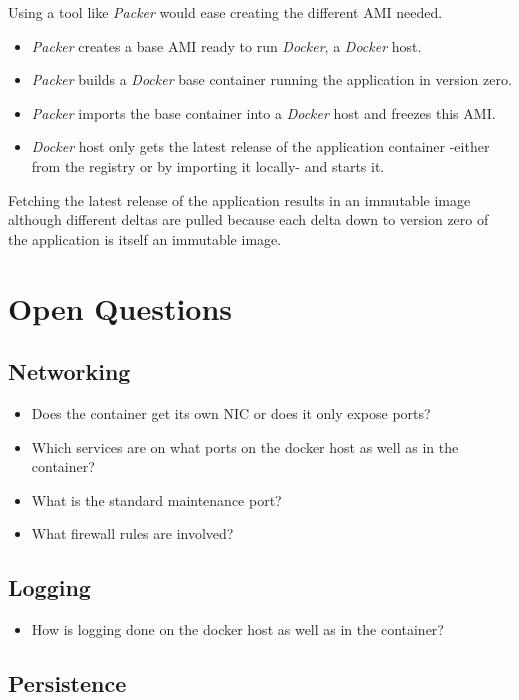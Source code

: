 \documentclass[captions=tableheading]{article}
\begin{document}
Using a tool like \emph{Packer} would ease creating the different AMI needed.
\begin{itemize}
\item \emph{Packer} creates a base AMI ready to run \emph{Docker}, a \emph{Docker} host.
\item \emph{Packer} builds a \emph{Docker} base container running the application in version zero.
\item \emph{Packer} imports the base container into a \emph{Docker} host and freezes this AMI.
\item \emph{Docker} host only gets the latest release of the application container -either from the registry or by importing it locally- and starts it.
\end{itemize}
Fetching the latest release of the application results in an immutable image although different deltas are pulled because each delta down to version zero of the application is itself an  immutable image.
\section{Open Questions}
\label{sec-10}
\subsection{Networking}
\label{sec-10-1}

\begin{itemize}
\item Does the container get its own NIC or does it only expose ports?
\item Which services are on what ports on the docker host as well as in the container?
\item What is the standard maintenance port?
\item What firewall rules are involved?
\end{itemize}
\subsection{Logging}
\label{sec-10-2}

\begin{itemize}
\item How is logging done on the docker host as well as in the container?
\end{itemize}
\subsection{Persistence}
\label{sec-10-3}
\end{document}
